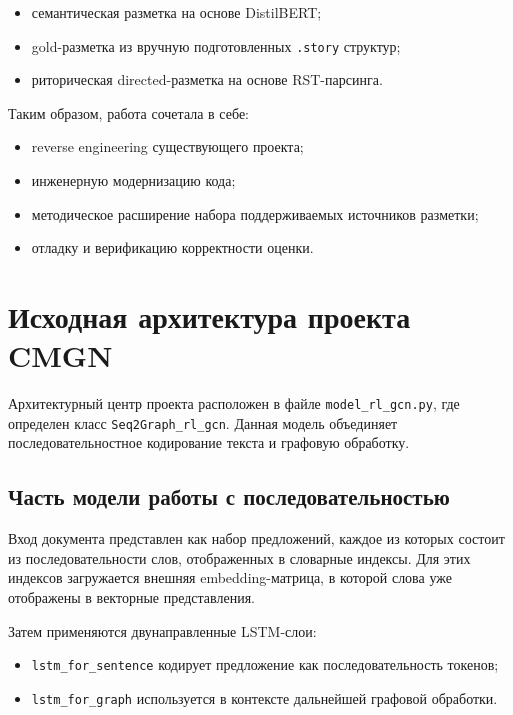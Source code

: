 \documentclass[12pt,a4paper]{article}
\begin{document}
\begin{itemize}
    \item семантическая разметка на основе DistilBERT;
    \item gold-разметка из вручную подготовленных \texttt{.story} структур;
    \item риторическая directed-разметка на основе RST-парсинга.
\end{itemize}

Таким образом, работа сочетала в себе:

\begin{itemize}
    \item reverse engineering существующего проекта;
    \item инженерную модернизацию кода;
    \item методическое расширение набора поддерживаемых источников разметки;
    \item отладку и верификацию корректности оценки.
\end{itemize}

\section{Исходная архитектура проекта CMGN}

Архитектурный центр проекта расположен в файле \texttt{model\_rl\_gcn.py}, где определен
класс \texttt{Seq2Graph\_rl\_gcn}. Данная модель объединяет последовательностное
кодирование текста и графовую обработку.

\subsection{Часть модели работы с последовательностью}

Вход документа представлен как набор предложений, каждое из которых состоит из
последовательности слов, отображенных в словарные индексы. Для этих индексов загружается
внешняя embedding-матрица, в которой слова уже отображены в векторные представления.

Затем применяются двунаправленные LSTM-слои:

\begin{itemize}
    \item \texttt{lstm\_for\_sentence} кодирует предложение как последовательность токенов;
    \item \texttt{lstm\_for\_graph} используется в контексте дальнейшей графовой обработки.
\end{itemize}
\end{document}
